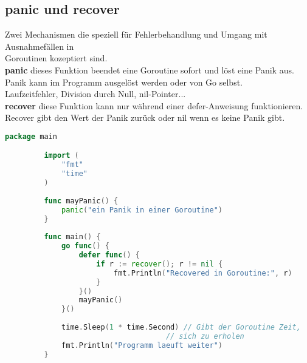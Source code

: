 \documentclass[twoside,a4paper,12pt]{article}
\begin{document}
\subsection{panic und recover}
Zwei Mechanismen die speziell für Fehlerbehandlung und Umgang mit Ausnahmefällen in \\ 
Goroutinen kozeptiert sind. \\ 
\textbf{panic} dieses Funktion beendet eine Goroutine sofort und löst eine Panik aus. \\ 
Panik kann im Programm ausgelöst werden oder von Go selbst. \\ 
Laufzeitfehler, Division durch Null, nil-Pointer... \\ 
\textbf{recover} diese Funktion kann nur während einer defer-Anweisung funktionieren. \\ 
Recover gibt den Wert der Panik zurück oder nil wenn es keine Panik gibt.
\begin{center} 
  \begin{minipage}{1.0\textwidth}
    \begin{lstlisting}[language=Go]
     package main

		 import (
		     "fmt"
		     "time"
		 )
		 
		 func mayPanic() {
		     panic("ein Panik in einer Goroutine")
		 }
		 
		 func main() {
		     go func() {
		         defer func() {
		             if r := recover(); r != nil {
		                 fmt.Println("Recovered in Goroutine:", r)
		             }
		         }()
		         mayPanic()
		     }()
		 
		     time.Sleep(1 * time.Second) // Gibt der Goroutine Zeit, 
                                     // sich zu erholen
		     fmt.Println("Programm laeuft weiter")
		 } 
    \end{lstlisting}
  \end{minipage}
\end{center}

\newpage
\end{document}
